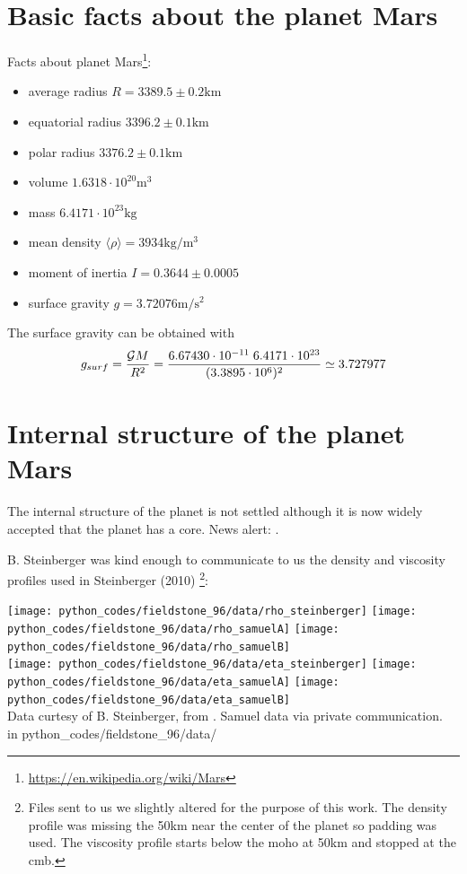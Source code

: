 \newpage
\section*{Basic facts about the planet Mars}

Facts about planet Mars\footnote{\url{https://en.wikipedia.org/wiki/Mars}}:
\begin{itemize}
\item average radius $R=3389.5 \pm 0.2 \si{\km}$
\item equatorial radius $3396.2 \pm 0.1 \si{\km}$
\item polar radius $3376.2 \pm 0.1 \si{\km}$
\item volume $1.6318 \cdot 10^{20} \si{\cubic\metre}$
\item mass $6.4171 \cdot 10^{23}\si{\kilo\gram}$
\item mean density $\langle\rho\rangle= 3934\si{\kilo\gram\per\cubic\meter}$
\item moment of inertia $I=0.3644 \pm 0.0005$
\item surface gravity $g=3.72076 \si{\metre\per\square\second}$
\end{itemize}

The surface gravity can be obtained with 
\[
g_{surf}=\frac{{\cal G} M}{R^2} 
=\frac{6.67430 \cdot 10^{-11} \; 6.4171 \cdot 10^{23} }{(3.3895\cdot 10^6)^2}
\simeq 3.727977
\]

\section*{Internal structure of the planet Mars}

The internal structure of the planet is not settled although 
it is now widely accepted that the planet has a core. News alert: \cite{khcv21,stkb21,knpb21}. 

B. Steinberger was kind enough to communicate to us the density and viscosity 
profiles used in Steinberger \etal (2010) \cite{stwt10} \footnote{Files sent to us 
we slightly altered for the purpose of this work. The density profile was missing 
the 50km near the center of the planet so padding was used. The viscosity profile 
starts below the moho at 50\si{\km} and stopped at the cmb.}:

\begin{center}
\texttt{[image: python\_codes/fieldstone\_96/data/rho\_steinberger]}
\texttt{[image: python\_codes/fieldstone\_96/data/rho\_samuelA]}
\texttt{[image: python\_codes/fieldstone\_96/data/rho\_samuelB]}\\
\texttt{[image: python\_codes/fieldstone\_96/data/eta\_steinberger]}
\texttt{[image: python\_codes/fieldstone\_96/data/eta\_samuelA]}
\texttt{[image: python\_codes/fieldstone\_96/data/eta\_samuelB]}\\
{\captionfont Data curtesy of B. Steinberger, from \cite{stwt10}.
Samuel data via private communication.} \\
{\tiny {\color{gray} in python\_codes/fieldstone\_96/data/}}
\end{center}

